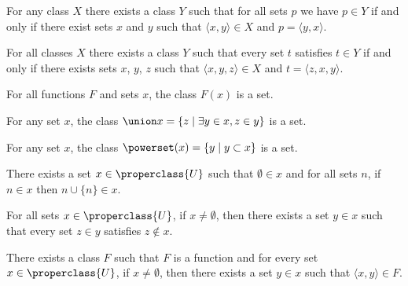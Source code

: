 \begin{node}[Axioms]
\begin{node}\label{nbg-000C}%
For any class $X$ there exists a class $Y$ such that for all sets $p$ we
have $p\in Y$ if and only if there exist sets $x$ and $y$ such that
$\langle x,y\rangle\in X$ and $p=\langle y,x\rangle$.
\end{node}

\begin{node}\label{nbg-000I}%
For all classes $X$ there exists a class $Y$ such that every set $t$
satisfies $t\in Y$ if and only if there exists sets $x$, $y$, $z$ such
that $\langle x,y,z\rangle\in X$ and $t=\langle z,x,y\rangle$.
\end{node}

\begin{node}\label{nbg-000J}%
For all functions $F$ and sets $x$, the class $F(x)$ is a set.
\end{node}

\begin{node}\label{nbg-000K}%
For any set $x$, the class $\union x=\{z\mid\exists y\in x,z\in y\}$
is a set.
\end{node}

\begin{node}\label{nbg-000L}%
For any set $x$, the class $\powerset(x)=\{y\mid y\subset x\}$ is a set.
\end{node}

\begin{node}\label{nbg-000M}%
There exists a set $x\in\properclass{U}$ such that $\emptyset\in x$
and for all sets $n$, if $n\in x$ then $n\cup\{n\}\in x$.
\end{node}

\begin{node}\label{nbg-000N}%
For all sets $x\in\properclass{U}$, if $x\neq\emptyset$, then there exists a
set $y\in x$ such that every set $z\in y$ satisfies $z\notin x$.
\end{node}

\begin{node}\label{nbg-000O}%
There exists a class $F$ such that $F$ is a function and for every set
$x\in\properclass{U}$, if $x\neq\emptyset$, then there exists a set $y\in x$
such that $\langle x,y\rangle\in F$.
\end{node}
\end{node}

